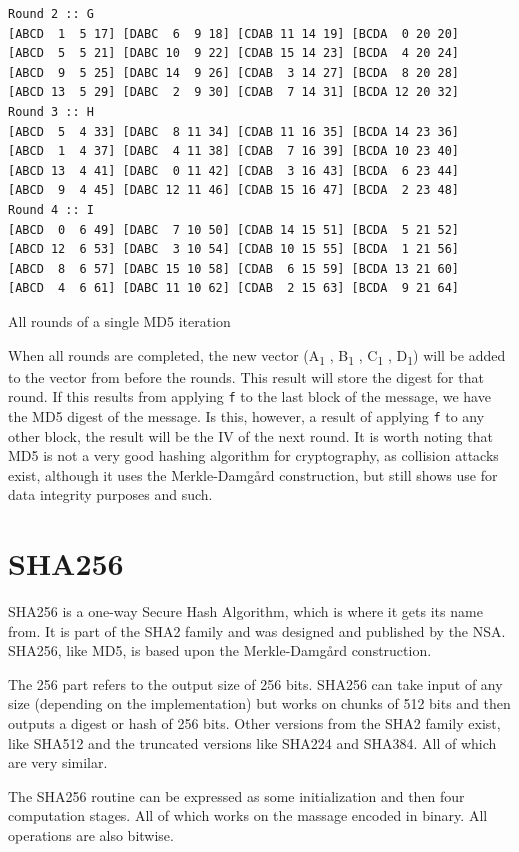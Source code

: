 \documentclass[a4paper, openany]{book}
\begin{document}
\begin{abstact}
\begin{table}[!htb]
\begin{verbatim}
Round 2 :: G
[ABCD  1  5 17] [DABC  6  9 18] [CDAB 11 14 19] [BCDA  0 20 20]
[ABCD  5  5 21] [DABC 10  9 22] [CDAB 15 14 23] [BCDA  4 20 24]
[ABCD  9  5 25] [DABC 14  9 26] [CDAB  3 14 27] [BCDA  8 20 28]
[ABCD 13  5 29] [DABC  2  9 30] [CDAB  7 14 31] [BCDA 12 20 32]
Round 3 :: H
[ABCD  5  4 33] [DABC  8 11 34] [CDAB 11 16 35] [BCDA 14 23 36]
[ABCD  1  4 37] [DABC  4 11 38] [CDAB  7 16 39] [BCDA 10 23 40]
[ABCD 13  4 41] [DABC  0 11 42] [CDAB  3 16 43] [BCDA  6 23 44]
[ABCD  9  4 45] [DABC 12 11 46] [CDAB 15 16 47] [BCDA  2 23 48]
Round 4 :: I
[ABCD  0  6 49] [DABC  7 10 50] [CDAB 14 15 51] [BCDA  5 21 52]
[ABCD 12  6 53] [DABC  3 10 54] [CDAB 10 15 55] [BCDA  1 21 56]
[ABCD  8  6 57] [DABC 15 10 58] [CDAB  6 15 59] [BCDA 13 21 60]
[ABCD  4  6 61] [DABC 11 10 62] [CDAB  2 15 63] [BCDA  9 21 64]
\end{verbatim}
\caption{All rounds of a single MD5 iteration}
\label{fig:MD5Rounds}
\end{table}
When all rounds are completed, the new vector (A\textsubscript{1} , B\textsubscript{1} , C\textsubscript{1} , D\textsubscript{1}) will be added to the vector from before the rounds. This result will store the digest for that round. If this results from applying \texttt{f} to the last block of the message, we have the MD5 digest of the message. Is this, however, a result of applying \texttt{f} to any other block, the result will be the IV of the next round.
It is worth noting that MD5 is not a very good hashing algorithm for cryptography, as collision attacks exist, although it uses the Merkle-Damgård construction, but still shows use for data integrity purposes and such.
\section{SHA256}
\label{SHAalg}
SHA256 is a one-way Secure Hash Algorithm, which is where it gets its name from.
It is part of the SHA2 family and was designed and published by the NSA.
SHA256, like MD5, is based upon the Merkle-Damgård construction.

The 256 part refers to the output size of 256 bits.
SHA256 can take input of any size (depending on the implementation) but works
on chunks of 512 bits and then outputs a digest or hash of 256 bits.
Other versions from the SHA2 family exist, like SHA512 and the truncated
versions like SHA224 and SHA384. All of which are very similar.

The SHA256 routine can be expressed as some initialization and then four computation stages.
All of which works on the massage encoded in binary. All operations are also bitwise.


\end{abstact}
\end{document}
